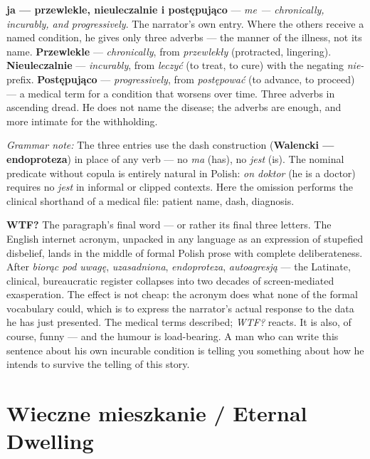 \textbf{ja --- przewlekle, nieuleczalnie i postępująco}
--- \textit{me --- chronically, incurably, and
progressively}. The narrator's own entry. Where the
others receive a named condition, he gives only three
adverbs --- the manner of the illness, not its name.
\textbf{Przewlekle} --- \textit{chronically}, from
\textit{przewlekły} (protracted, lingering).
\textbf{Nieuleczalnie} --- \textit{incurably}, from
\textit{leczyć} (to treat, to cure) with the negating
\textit{nie-} prefix. \textbf{Postępująco} ---
\textit{progressively}, from \textit{postępować}
(to advance, to proceed) --- a medical term for a
condition that worsens over time. Three adverbs in
ascending dread. He does not name the disease; the
adverbs are enough, and more intimate for the
withholding.

\medskip
\noindent\textit{Grammar note:} The three entries use
the dash construction (\textbf{Walencki --- endoproteza})
in place of any verb --- no \textit{ma} (has), no
\textit{jest} (is). The nominal predicate without
copula is entirely natural in Polish: \textit{on
doktor} (he is a doctor) requires no \textit{jest}
in informal or clipped contexts. Here the omission
performs the clinical shorthand of a medical file:
patient name, dash, diagnosis.

\medskip

\textbf{WTF?} The paragraph's final word --- or rather
its final three letters. The English internet acronym,
unpacked in any language as an expression of stupefied
disbelief, lands in the middle of formal Polish prose
with complete deliberateness. After \textit{biorąc pod
uwagę}, \textit{uzasadniona}, \textit{endoproteza},
\textit{autoagresją} --- the Latinate, clinical,
bureaucratic register collapses into two decades of
screen-mediated exasperation. The effect is not cheap:
the acronym does what none of the formal vocabulary
could, which is to express the narrator's actual
response to the data he has just presented. The medical
terms described; \textit{WTF?} reacts. It is also, of
course, funny --- and the humour is load-bearing.
A man who can write this sentence about his own
incurable condition is telling you something about
how he intends to survive the telling of this story.

\section{Wieczne mieszkanie / Eternal Dwelling}

